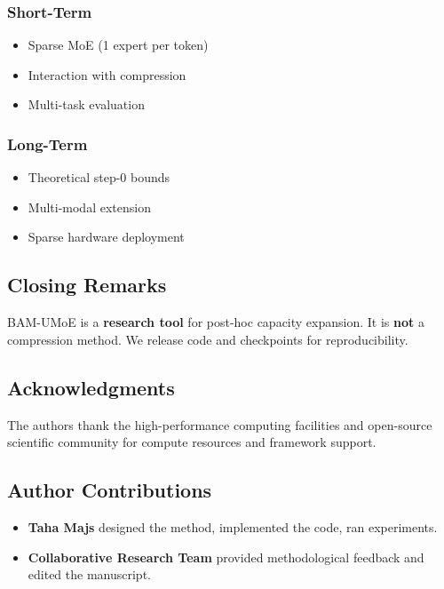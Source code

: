 \subsubsection{Short-Term}
\begin{itemize}
\item Sparse MoE (1 expert per token)
\item Interaction with compression
\item Multi-task evaluation

\end{itemize}
\subsubsection{Long-Term}
\begin{itemize}
\item Theoretical step-0 bounds
\item Multi-modal extension
\item Sparse hardware deployment

\end{itemize}
\subsection{Closing Remarks}

BAM-UMoE is a \textbf{research tool} for post-hoc capacity expansion. It is 
\textbf{not} a compression method. We release code and checkpoints for 
reproducibility.

\subsection{Acknowledgments}

The authors thank the high-performance computing facilities and open-source scientific community for compute resources and framework support.

\subsection{Author Contributions}

\begin{itemize}
\item \textbf{Taha Majs} designed the method, implemented the code, ran experiments.
\item \textbf{Collaborative Research Team} provided methodological feedback and edited the manuscript.

\end{itemize}
